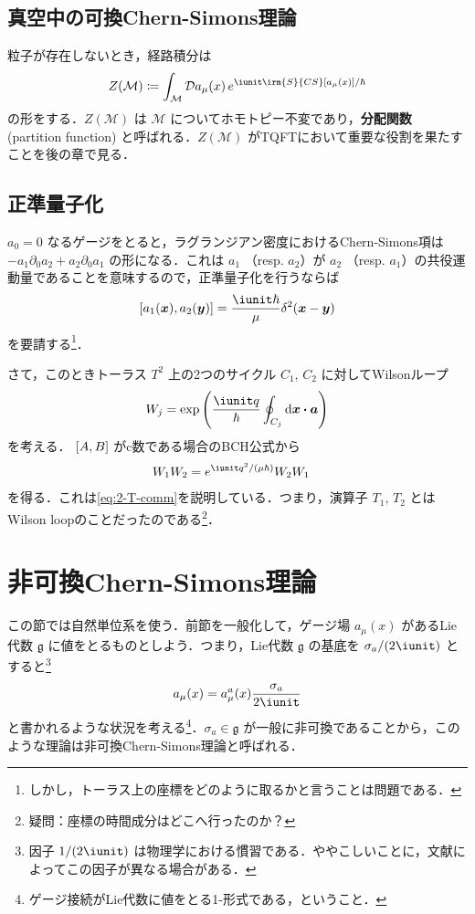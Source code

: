 \documentclass[TQFT_main]{subfiles}
\begin{document}
\subsection{真空中の可換Chern-Simons理論}

粒子が存在しないとき，経路積分は
\begin{align}
    Z(\mathcal{M}) \coloneqq \int_{\mathcal{M}} \mathcal{D} a_\mu (x)\, e^{\iunit \irm{S}{CS}[a_\mu (x)]/\hbar}
\end{align}
の形をする．$Z(\mathcal{M})$ は $\mathcal{M}$ についてホモトピー不変であり，\textbf{分配関数} (partition function) と呼ばれる．$Z(\mathcal{M})$ がTQFTにおいて重要な役割を果たすことを後の章で見る．

\subsection{正準量子化}

$a_0 = 0$ なるゲージをとると，ラグランジアン密度におけるChern-Simons項は $-a_1 \partial_0 a_2 + a_2 \partial_0 a_1$ の形になる．これは $a_1$ （resp. $a_2$）が $a_2$ （resp. $a_1$）の共役運動量であることを意味するので，正準量子化を行うならば
\begin{align}
    \comm{a_1(\bm{x})}{a_2(\bm{y})} = \frac{\iunit \hbar}{\mu} \delta^2 (\bm{x} - \bm{y})
\end{align}
を要請する\footnote{しかし，トーラス上の座標をどのように取るかと言うことは問題である．}．

さて，このときトーラス $T^2$ 上の2つのサイクル $C_1,\, C_2$ に対してWilsonループ
\begin{align}
    W_j = \exp \left( \frac{\iunit q}{\hbar} \oint_{C_j} \dd{\bm{x}} \vdot \bm{a} \right) 
\end{align}
を考える．
$\comm{A}{B}$ がc数である場合のBCH公式から
\begin{align}
    W_1 W_2 &= e^{\iunit q^2 / (\mu \hbar)} W_2 W_1
\end{align}
を得る．これは\eqref{eq:2-T-comm}を説明している．つまり，演算子 $T_1,\, T_2$ とはWilson loopのことだったのである\footnote{疑問：座標の時間成分はどこへ行ったのか？}．

\section{非可換Chern-Simons理論}

この節では自然単位系を使う．前節を一般化して，ゲージ場 $a_\mu (x)$ があるLie代数 $\mathfrak{g}$ に値をとるものとしよう．つまり，Lie代数 $\mathfrak{g}$ の基底を $\sigma_a / (2\iunit)$ とすると\footnote{因子 $1/(2\iunit)$ は物理学における慣習である．ややこしいことに，文献によってこの因子が異なる場合がある．}
\begin{align}
    a_\mu (x) = a_\mu^a (x) \frac{\sigma_a}{2\iunit}
\end{align}
と書かれるような状況を考える\footnote{ゲージ接続がLie代数に値をとる1-形式である，ということ．}．$\sigma_a \in \mathfrak{g}$ が一般に非可換であることから，このような理論は非可換Chern-Simons理論と呼ばれる．
\end{document}
